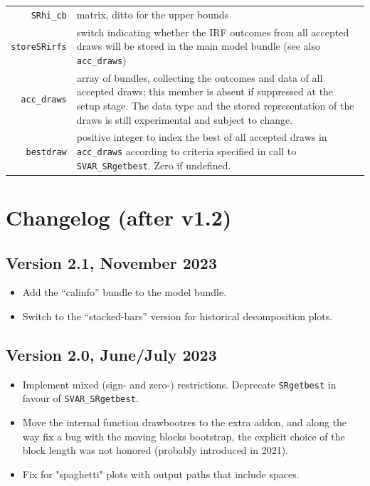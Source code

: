 \documentclass[a4paper,10pt]{article}
\newcommand{\cmd}[1]{\texttt{#1}}
\begin{document}
\begin{tabular}{rp{}}
  \texttt{SRhi\_cb} & matrix, ditto for the upper bounds\\
  
   \texttt{storeSRirfs} & switch indicating whether the IRF outcomes from all accepted draws
     will be stored in the main model bundle (see also \texttt{acc\_draws})\\
   \texttt{acc\_draws} & array of bundles, collecting the outcomes and data of all accepted 
   draws; this member is absent if suppressed at the setup stage. The data type and the 
   stored representation of the draws is still experimental and subject to change.\\
   
   \texttt{bestdraw} & positive integer to index the best of all accepted draws in \texttt{acc\_draws} 
   according to criteria specified in call to \texttt{SVAR\_SRgetbest}. Zero if undefined. 
  \end{tabular}
  
\section{Changelog (after v1.2)}
\label{sec:changelog}

\subsection*{Version 2.1, November 2023}
\begin{itemize}
\item Add the ``calinfo'' bundle to the model bundle. 
\item Switch to the ``stacked-bars'' version for historical
  decomposition plots. 
\end{itemize}

\subsection*{Version 2.0, June/July 2023}
\begin{itemize}
\item Implement mixed (sign- and zero-) restrictions. Deprecate \cmd{SRgetbest}
 in favour of \cmd{SVAR\_SRgetbest}. 
\item Move the internal function drawbootres to the extra addon, and along the
 way fix a bug with the moving blocks bootstrap, the explicit choice of the
 block length was not honored (probably introduced in 2021).  
\item Fix for "spaghetti" plots with output paths that include spaces.   
\end{itemize}
\end{document}
